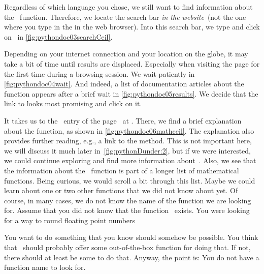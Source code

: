 Regardless of which language you chose, we still want to find information about the ~function.
Therefore, we locate the search bar \emph{in the website}~(not the one where you type in the  in the web browser).
Into this search bar, we type  and click on~ in \cref{fig:pythondoc03searchCeil}.

Depending on your internet connection and your location on the globe, it may take a bit of time until results are displaced.
Especially when visiting the page for the first time during a browsing session.
We wait patiently in \cref{fig:pythondoc04wait}.
And indeed, a list of documentation articles about the  function appears after a brief wait in \cref{fig:pythondoc05results}.
We decide that the link to  looks most promising and click on it.

It takes us to the ~entry of the  page~\cite{PSF:P3D:TPSL:MMF} at .
There, we find a brief explanation about the  function, as shown in \cref{fig:pythondoc06mathceil}.
The explanation also provides further reading, e.g., a link to the  method.
This is not important here, we will discuss it much later in~\cref{fig:pythonDunder:2}, but if we were interested, we could continue exploring and find more information about~.
Also, we see that the information about the ~function is part of a longer list of mathematical functions.
Being curious, we would scroll a bit through this list.
Maybe we could learn about one or two other functions that we did not know about yet.%
%
%
%
Of course, in many cases, we do not know the name of the function we are looking for.
Assume that you did not know that the function~ exists.
You were looking for a way to round floating point numbers 

You want to do something that you know should somehow be possible.
You think that \python\ should probably offer some out-of-the-box function for doing that.
If not, there should at least be some  to do that.
Anyway, the point is:
You do not have a function name to look for.

